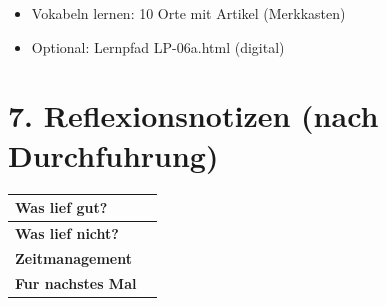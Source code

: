 \documentclass[11pt, a4paper]{article}
\newcommand{\sequenz}{06}
\newcommand{\block}{a}
\begin{document}
\begin{itemize}
    \item Vokabeln lernen: 10 Orte mit Artikel (Merkkasten)
    \item Optional: Lernpfad LP-\sequenz\block.html (digital)
\end{itemize}


\section*{7. Reflexionsnotizen (nach Durchfuhrung)}

\begin{tabularx}{\textwidth}{|l|X|}
\hline
\textbf{Was lief gut?} & \\[2em]
\hline
\textbf{Was lief nicht?} & \\[2em]
\hline
\textbf{Zeitmanagement} & \\[2em]
\hline
\textbf{Fur nachstes Mal} & \\[2em]
\hline
\end{tabularx}
\end{document}
